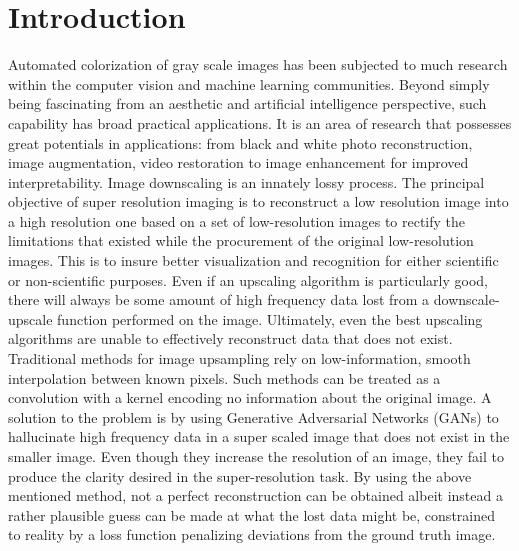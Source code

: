 \documentclass[conference]{IEEEtran}
\begin{document}
\section{Introduction}
Automated colorization of gray scale images has been subjected to much research within the computer vision and machine learning communities. Beyond simply being fascinating from an aesthetic and artificial intelligence perspective, such capability has broad practical applications. It is an area of research that possesses great potentials in applications: from black and white photo reconstruction, image augmentation, video restoration to image enhancement for improved interpretability. 
Image downscaling is an innately lossy process. The principal objective of super resolution imaging is to reconstruct a low resolution image into a high resolution one based on a set of low-resolution images to rectify the limitations that existed while the procurement of the original low-resolution images. This is to insure better visualization and recognition for either scientific or non-scientific purposes. Even if an upscaling algorithm is particularly good, there will always be some amount of high frequency data lost from a downscale-upscale function performed on the image. Ultimately, even the best upscaling algorithms are unable to effectively reconstruct data that does not exist. Traditional methods for image upsampling rely on low-information, smooth interpolation between known pixels. Such methods can be treated as a convolution with a kernel encoding no information about the original image. A solution to the problem is by using Generative Adversarial Networks (GANs) to hallucinate high frequency data in a super scaled image that does not exist in the smaller image. Even though they increase the resolution of an image, they fail to produce the clarity desired in the super-resolution task. By using the above mentioned method, not a perfect reconstruction can be obtained albeit instead a rather plausible guess can be made at what the lost data might be, constrained to reality by a loss function penalizing deviations from the ground truth image.\\  
\end{document}
